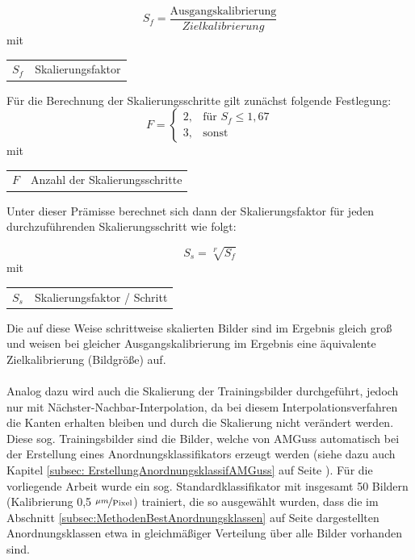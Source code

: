 \documentclass[
fontsize=10pt, 
listof = totoc,
parskip = half	
]{report}
\makeatletter
\newenvironment{conditions}
{\par\vspace{\abovedisplayskip}\noindent\begin{tabular}{>{$}l<{$} @{${}:{}$} l}}
	{\end{tabular}\par\vspace{\belowdisplayskip}}
\makeatother
\begin{document}
\begin{equation}
	S_f = \frac{\text{Ausgangskalibrierung}}{Zielkalibrierung}
\end{equation}
mit
\begin{conditions}
	S_f & Skalierungsfaktor
\end{conditions}

\noindent Für die Berechnung der Skalierungsschritte gilt zunächst folgende Festlegung:
\begin{equation}
	F = 
	\begin{cases}
		 2,		&	\text{für } S_f \leq 1,67\\
		 3, 	&	\text{sonst}
	\end{cases}
\end{equation}
mit
\begin{conditions}
	F & Anzahl der Skalierungsschritte
\end{conditions}

\noindent Unter dieser Prämisse berechnet sich dann der Skalierungsfaktor für jeden durchzuführenden Skalierungsschritt wie folgt:

\begin{equation}
	S_s = \sqrt[F]{S_f}
\end{equation}
mit
\begin{conditions}
	S_{s} & Skalierungsfaktor / Schritt
\end{conditions}

\noindent Die auf diese Weise schrittweise skalierten Bilder sind im Ergebnis gleich groß und weisen bei gleicher Ausgangskalibrierung im Ergebnis eine äquivalente Zielkalibrierung (Bildgröße) auf.
\\\\
\noindent Analog dazu wird auch die Skalierung der Trainingsbilder durchgeführt, jedoch nur mit Nächster-Nachbar-Interpolation, da bei diesem Interpolationsverfahren die Kanten erhalten bleiben und durch die Skalierung nicht verändert werden. Diese sog. Trainingsbilder sind die Bilder, welche von AMGuss automatisch bei der Erstellung eines Anordnungsklassifikators erzeugt werden (siehe dazu auch Kapitel \ref{subsec: ErstellungAnordnungsklassifAMGuss} auf Seite \pageref{subsec: ErstellungAnordnungsklassifAMGuss}). Für die vorliegende Arbeit wurde ein sog. Standardklassifikator mit insgesamt 50 Bildern (Kalibrierung 0,5 $\nicefrac{\mu m}{\text{Pixel}}$) trainiert, die so ausgewählt wurden, dass die im Abschnitt \ref{subsec:MethodenBestAnordnungsklassen} auf Seite \pageref{subsec:MethodenBestAnordnungsklassen} dargestellten Anordnungsklassen etwa in gleichmäßiger Verteilung über alle Bilder vorhanden sind.
\end{document}
